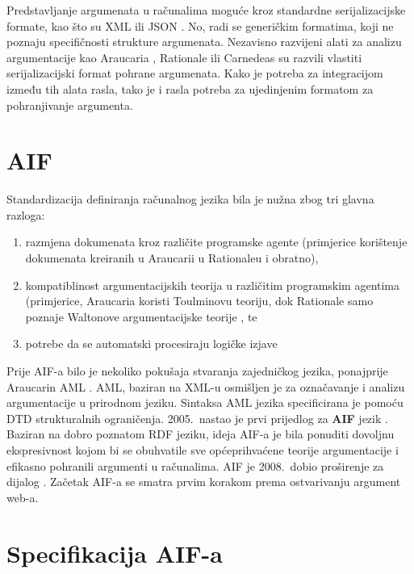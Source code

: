 Predstavljanje argumenata u računalima moguće kroz standardne 
serijalizacijske formate, kao što su
XML  ili JSON . 
No, radi se generičkim formatima, koji ne poznaju specifičnosti 
strukture argumenata. Nezavisno razvijeni alati 
za analizu argumentacije kao Araucaria \citep{reed2004araucaria},
Rationale \citep{van2007rationale}
ili Carnedeas \citep{gordon2006carneades}
su razvili vlastiti serijalizacijski format pohrane
argumenata. Kako je potreba za integracijom između tih alata rasla, tako
je i rasla potreba za ujedinjenim formatom za pohranjivanje argumenta. 

\section{AIF}

Standardizacija definiranja računalnog jezika bila je nužna zbog tri glavna razloga:
\begin{enumerate}
    \item razmjena dokumenata kroz različite programske agente (primjerice 
korištenje dokumenata kreiranih u Araucarii u Rationaleu i obratno), 
    \item kompatiblinost argumentacijskih teorija u različitim programskim agentima
(primjerice, Araucaria koristi Toulminovu teoriju, dok Rationale samo poznaje 
Waltonove argumentacijske teorije \citep{walton2012argument}, te 
    \item potrebe da se automatski procesiraju logičke izjave
\end{enumerate}

Prije AIF-a bilo je nekoliko pokušaja stvaranja zajedničkog jezika, ponajprije
Araucarin AML . AML, baziran na XML-u
 osmišljen je za označavanje i analizu
argumentacije u prirodnom jeziku. Sintaksa AML jezika specificirana je pomoću
DTD  strukturalnih ograničenja.  
2005.\ nastao je prvi prijedlog za \textbf{AIF}  jezik \citep{chesnevar2006towards}. 
Baziran na dobro poznatom RDF jeziku, ideja AIF-a
je bila ponuditi dovoljnu ekspresivnost kojom bi se obuhvatile sve
općeprihvaćene teorije argumentacije i efikasno pohranili 
argumenti u računalima. 
AIF je 2008.\ dobio proširenje za dijalog \citep{reed2008aif+}.
Začetak AIF-a se smatra prvim korakom
prema ostvarivanju argument web-a. 


\section{Specifikacija AIF-a}

